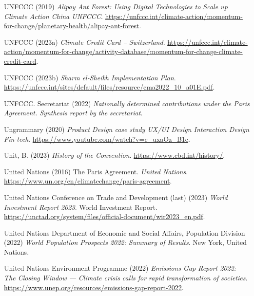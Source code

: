 \documentclass[
  letterpaper,
  DIV=11,
  numbers=noendperiod]{scrartcl}
\newlength{\cslhangindent}
\newenvironment{CSLReferences}[2] %
 {\begin{list}{}{%
  \setlength{\itemindent}{0pt}
  \setlength{\leftmargin}{0pt}
  \setlength{\parsep}{0pt}
  \ifodd #1
   \setlength{\leftmargin}{\cslhangindent}
   \setlength{\itemindent}{-1\cslhangindent}
  \fi
  \setlength{\itemsep}{#2\baselineskip}}}
 {\end{list}}
\begin{document}
\begin{CSLReferences}{0}{1}
UNFCCC (2019) \emph{Alipay {Ant Forest}: {Using Digital Technologies} to
{Scale} up {Climate Action} {\textbar} {China} {\textbar} {UNFCCC}}.
\url{https://unfccc.int/climate-action/momentum-for-change/planetary-health/alipay-ant-forest}.

UNFCCC (2023a) \emph{Climate {Credit Card} -- {Switzerland}}.
\url{https://unfccc.int/climate-action/momentum-for-change/activity-database/momentum-for-change-climate-credit-card}.

UNFCCC (2023b) \emph{Sharm el-{Sheikh Implementation Plan}}.
\url{https://unfccc.int/sites/default/files/resource/cma2022_10_a01E.pdf}.

UNFCCC. Secretariat (2022) \emph{Nationally determined contributions
under the {Paris Agreement}. {Synthesis} report by the secretariat}.

Ungrammary (2020) \emph{Product {Design} case study {\textbar} {UX}/{UI
Design} {\textbar} {Interaction Design} {\textbar} {Fin-tech}}.
\url{https://www.youtube.com/watch?v=c_uxaOz_B1c}.

Unit, B. (2023) \emph{History of the {Convention}}.
\url{https://www.cbd.int/history/}.

United Nations (2016) The {Paris Agreement}. \emph{United Nations}.
\url{https://www.un.org/en/climatechange/paris-agreement}.

United Nations Conference on Trade and Development (last) (2023)
\emph{World {Investment Report} 2023}. World {Investment Report}.
\url{https://unctad.org/system/files/official-document/wir2023_en.pdf}.

United Nations Department of Economic and Social Affairs, Population
Division (2022) \emph{World {Population Prospects} 2022: {Summary} of
{Results}}. New York, United Nations.

United Nations Environment Programme (2022) \emph{Emissions {Gap Report}
2022: {The Closing Window} --- {Climate} crisis calls for rapid
transformation of societies}.
\url{https://www.unep.org/resources/emissions-gap-report-2022}.


\end{CSLReferences}
\end{document}
